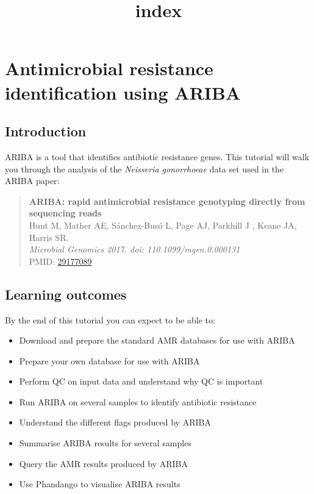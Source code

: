 \documentclass[11pt]{article}
\title{index}
\providecommand{\tightlist}{%
      \setlength{\itemsep}{0pt}\setlength{\parskip}{0pt}}
\begin{document}
    \hypertarget{antimicrobial-resistance-identification-using-ariba}{%
\section{Antimicrobial resistance identification using
ARIBA}\label{antimicrobial-resistance-identification-using-ariba}}

\hypertarget{introduction}{%
\subsection{Introduction}\label{introduction}}

ARIBA is a tool that identifies antibiotic resistance genes. This
tutorial will walk you through the analysis of the \textit{Neisseria
gonorrhoeae} data set used in the ARIBA paper:

\begin{quote}
\textbf{ARIBA: rapid antimicrobial resistance genotyping directly from
sequencing reads}\\
Hunt M, Mather AE, Sánchez-Busó L, Page AJ, Parkhill J , Keane JA,
Harris SR.\\
\textit{Microbial Genomics 2017. doi: 110.1099/mgen.0.000131}\\
PMID:
\href{https://www.ncbi.nlm.nih.gov/pmc/articles/PMC5695208/}{29177089}
\end{quote}

\hypertarget{learning-outcomes}{%
\subsection{Learning outcomes}\label{learning-outcomes}}

By the end of this tutorial you can expect to be able to:

\begin{itemize}
\tightlist
\item
  Download and prepare the standard AMR databases for use with ARIBA
\item
  Prepare your own database for use with ARIBA
\item
  Perform QC on input data and understand why QC is important
\item
  Run ARIBA on several samples to identify antibiotic resistance
\item
  Understand the different flags produced by ARIBA
\item
  Summarise ARIBA results for several samples
\item
  Query the AMR results produced by ARIBA
\item
  Use Phandango to visualise ARIBA results
\end{itemize}
\end{document}
